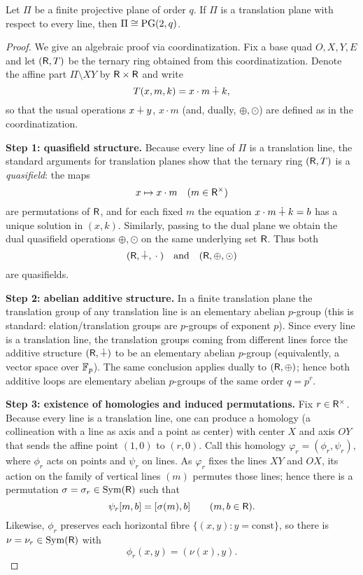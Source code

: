 \newpage

\begin{thm}
    Let\/ $\Pi$ be a finite projective plane of order\/ $q$.  
    If\/ $\Pi$ is a translation plane with respect to every line, then\/ $\Pi\cong\PG(2,q)$.
\end{thm}

\begin{proof}
We give an algebraic proof via coordinatization.  Fix a base quad\/ $O,X,Y,E$ and let\/ $(\ter,T)$ be the ternary ring obtained from this coordinatization.  Denote the affine part $\Pi\setminus XY$ by\/ $\ter\times\ter$ and write
\[
    T(x,m,k)=x\cdot m\+k,
\]
so that the usual operations $x\+y$, $x\cdot m$ (and, dually, $\oplus,\odot$) are defined as in the coordinatization.

\medskip\noindent\textbf{Step 1: quasifield structure.}
Because every line of\/ $\Pi$ is a translation line, the standard arguments for translation planes show that the ternary ring $(\ter,T)$ is a \emph{quasifield}: the maps
\[
    x\mapsto x\cdot m\quad(m\in\ter^\times)
\]
are permutations of\/ $\ter$, and for each fixed $m$ the equation $x\cdot m\+k=b$ has a unique solution in $(x,k)$.  Similarly, passing to the dual plane we obtain the dual quasifield operations $\oplus,\odot$ on the same underlying set\/ $\ter$.  Thus both
\[
    (\ter,\+,{}\cdot{})\quad\text{and}\quad(\ter,\oplus,\odot)
\]
are quasifields.

\medskip\noindent\textbf{Step 2: abelian additive structure.}
In a finite translation plane the translation group of any translation line is an elementary abelian $p$-group (this is standard: elation/translation groups are $p$-groups of exponent $p$).  Since every line is a translation line, the translation groups coming from different lines force the additive structure $(\ter,\+)$ to be an elementary abelian $p$-group (equivalently, a vector space over $\Fq[p]$).  The same conclusion applies dually to $(\ter,\oplus)$; hence both additive loops are elementary abelian $p$-groups of the same order $q=p^r$.

\medskip\noindent\textbf{Step 3: existence of homologies and induced permutations.}
Fix $r\in\ter^\times$.  Because every line is a translation line, one can produce a homology (a collineation with a line as axis and a point as center) with center $X$ and axis $OY$ that sends the affine point $(1,0)$ to $(r,0)$.  Call this homology $\varphi_r=(\phi_r,\psi_r)$, where $\phi_r$ acts on points and $\psi_r$ on lines.  As $\varphi_r$ fixes the lines $XY$ and $OX$, its action on the family of vertical lines $(m)$ permutes those lines; hence there is a permutation $\sigma=\sigma_r\in\Sym(\ter)$ such that
\[
    \psi_r[m,b]=[\sigma(m),b]\qquad(m,b\in\ter).
\]
Likewise, $\phi_r$ preserves each horizontal fibre $\{(x,y):y=\text{const}\}$, so there is $\nu=\nu_r\in\Sym(\ter)$ with
\[
    \phi_r(x,y)=(\nu(x),y).
\]


\end{proof}
